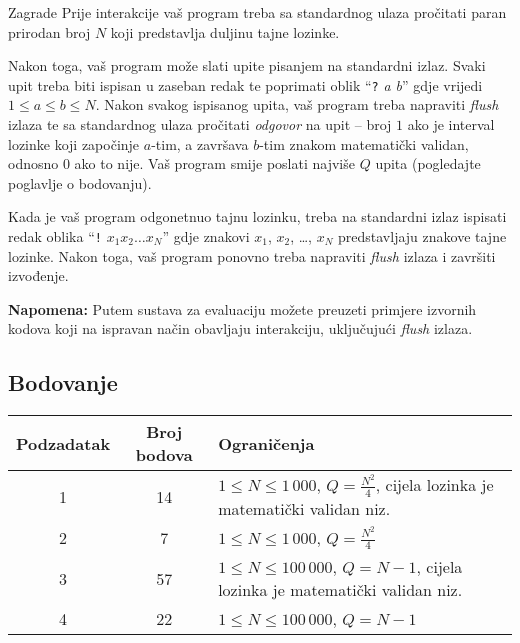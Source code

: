 \begin{statement}[
  problempoints=100,
  timelimit=1 sekunda,
  memorylimit=512 MiB,
]{Zagrade}
Prije interakcije vaš program treba sa standardnog ulaza pročitati paran
prirodan broj $N$ koji predstavlja duljinu tajne lozinke.

Nakon toga, vaš program može slati upite pisanjem na standardni izlaz. Svaki
upit treba biti ispisan u zaseban redak te poprimati oblik
``\texttt{?} \textit{a b}''
gdje vrijedi $1 \le a \le b \le N$. Nakon svakog ispisanog upita, vaš program
treba napraviti \textit{flush} izlaza te sa standardnog ulaza pročitati
\textit{odgovor} na upit -- broj $1$ ako je interval lozinke koji započinje
$a$-tim, a završava $b$-tim znakom matematički validan, odnosno $0$ ako to
nije. Vaš program smije poslati najviše $Q$ upita (pogledajte poglavlje o
bodovanju).

Kada je vaš program odgonetnuo tajnu lozinku, treba na standardni izlaz
ispisati redak oblika ``\texttt{!} \textit{$x_1x_2\dots x_N$}'' gdje znakovi
$x_1$, $x_2$, \dots, $x_N$ predstavljaju znakove tajne lozinke. Nakon toga, vaš
program ponovno treba napraviti \textit{flush} izlaza i završiti izvođenje.

\textbf{Napomena:} Putem sustava za evaluaciju možete preuzeti primjere
izvornih kodova koji na ispravan način obavljaju interakciju, uključujući
\textit{flush} izlaza.

\subsection*{Bodovanje}
{\renewcommand{\arraystretch}{1.4}
  \setlength{\tabcolsep}{6pt}
  \begin{tabular}{ccl}
    Podzadatak & Broj bodova & Ograničenja \\ \midrule
    1 & 14 & $1 \le N \le 1\,000$, $Q = \frac{N^2}{4}$, cijela lozinka je matematički validan niz. \\
    2 & 7 & $1 \le N \le 1\,000$, $Q = \frac{N^2}{4}$ \\
    3 & 57 & $1 \le N \le 100\,000 $, $Q = N - 1$, cijela lozinka je matematički validan niz. \\
    4 & 22 & $1 \le N \le 100\,000 $, $Q = N - 1$ \\
\end{tabular}}


\end{statement}
